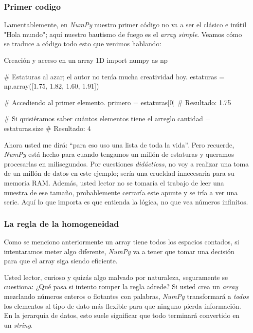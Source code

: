 \subsubsection{Primer codigo}

Lamentablemente, en \textit{NumPy} nuestro primer código no va a ser el clásico e inútil "Hola mundo"; aquí nuestro bautismo de fuego es el \textit{array simple}. Veamos cómo se traduce a código todo esto que venimos hablando: 

\begin{pycode}{Creación y acceso en un array 1D}
import numpy as np

# Estaturas al azar; el autor no tenía mucha creatividad hoy.
estaturas = np.array([1.75, 1.82, 1.60, 1.91]) 

# Accediendo al primer elemento.
primero = estaturas[0]  # Resultado: 1.75

# Si quisiéramos saber cuántos elementos tiene el arreglo
cantidad = estaturas.size # Resultado: 4
\end{pycode}

Ahora usted me dirá: ``para eso uso una lista de toda la vida''. Pero recuerde, \textit{NumPy} está hecho para cuando tengamos un millón de estaturas y queramos procesarlas en milisegundos. Por cuestiones \textit{didácticas}, no voy a realizar una toma de un millón de datos en este ejemplo; sería una crueldad innecesaria para su memoria RAM. Además, usted lector no se tomaría el trabajo de leer una muestra de ese tamaño, probablemente cerraría este apunte y se iría a ver una serie. Aquí lo que importa es que entienda la lógica, no que vea números infinitos.

\subsubsection{La regla de la homogeneidad}

Como se menciono anteriormente un array tiene todos los espacios contados, si intentaramos meter algo diferente, \textit{NumPy} va a tener que tomar una decisión para que el array siga siendo eficiente.

Usted lector, curioso y quizás algo malvado por naturaleza, seguramente se cuestiona: ¿Qué pasa si intento romper la regla adrede? Si usted crea un \textit{array} mezclando números enteros o flotantes con palabras, \textit{NumPy} transformará a \textit{todos} los elementos al tipo de dato más flexible para que ninguno pierda información. En la jerarquía de datos, esto suele significar que todo terminará convertido en un \textit{string}.


